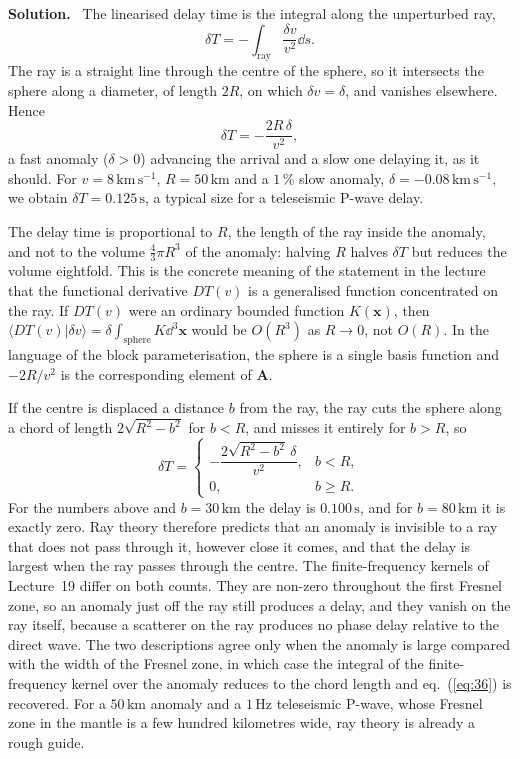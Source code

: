 \documentclass[a4paper,12pt]{paper}
\newenvironment{solution}{\par\noindent\textbf{Solution.}\ }{\par\medskip}
\begin{document}
\begin{solution}
The linearised delay time is the integral along the unperturbed ray,
\begin{equation}
    \delta T = -\int_{\mathrm{ray}}\frac{\delta v}{v^{2}}\dd s.
    \label{eq:34}
\end{equation}
The ray is a straight line through the centre of the sphere, so it intersects the sphere along a
diameter, of length $2R$, on which $\delta v=\delta$, and vanishes elsewhere. Hence
\begin{equation}
    \delta T = -\frac{2R\,\delta}{v^{2}},
    \label{eq:35}
\end{equation}
a fast anomaly ($\delta>0$) advancing the arrival and a slow one delaying it, as it should. For
$v=8\,\mathrm{km\,s^{-1}}$, $R=50\,\mathrm{km}$ and a $1\,\%$ slow anomaly, $\delta=-0.08\,\mathrm{km\,s^{-1}}$,
we obtain $\delta T = 0.125\,\mathrm{s}$, a typical size for a teleseismic P-wave delay.

The delay time is proportional to $R$, the length of the ray inside the anomaly, and not to the
volume $\tfrac{4}{3}\pi R^{3}$ of the anomaly: halving $R$ halves $\delta T$ but reduces the volume
eightfold. This is the concrete meaning of the statement in the lecture that the functional
derivative $DT(v)$ is a generalised function concentrated on the ray. If $DT(v)$ were an ordinary
bounded function $K(\mathbf{x})$, then $\langle DT(v)|\delta v\rangle = \delta\int_{\mathrm{sphere}}K\dd^{3}\mathbf{x}$
would be $O(R^{3})$ as $R\to0$, not $O(R)$. In the language of the block parameterisation, the
sphere is a single basis function and $-2R/v^{2}$ is the corresponding element of $\mathbf{A}$.

If the centre is displaced a distance $b$ from the ray, the ray cuts the sphere along a chord of
length $2\sqrt{R^{2}-b^{2}}$ for $b<R$, and misses it entirely for $b>R$, so
\begin{equation}
    \delta T = \begin{cases} -\dfrac{2\sqrt{R^{2}-b^{2}}\,\delta}{v^{2}}, & b<R, \\[8pt] 0, & b\geq R. \end{cases}
    \label{eq:36}
\end{equation}
For the numbers above and $b=30\,\mathrm{km}$ the delay is $0.100\,\mathrm{s}$, and for
$b=80\,\mathrm{km}$ it is exactly zero. Ray theory therefore predicts that an anomaly is invisible to
a ray that does not pass through it, however close it comes, and that the delay is largest when the
ray passes through the centre. The finite-frequency kernels of Lecture~19 differ on both counts. They
are non-zero throughout the first Fresnel zone, so an anomaly just off the ray still produces a
delay, and they vanish on the ray itself, because a scatterer on the ray produces no phase delay
relative to the direct wave. The two descriptions agree only when the anomaly is large compared with
the width of the Fresnel zone, in which case the integral of the finite-frequency kernel over the
anomaly reduces to the chord length and eq.~(\ref{eq:36}) is recovered. For a $50\,\mathrm{km}$
anomaly and a $1\,\mathrm{Hz}$ teleseismic P-wave, whose Fresnel zone in the mantle is a few hundred
kilometres wide, ray theory is already a rough guide.
\end{solution}
\end{document}
